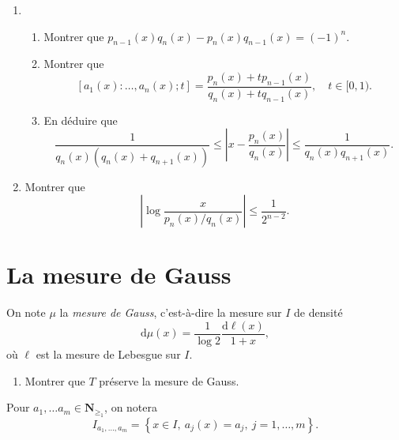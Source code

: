 \documentclass[a4paper,12pt]{article}
\theoremstyle{plain}
\theoremstyle{definition}
\newcommand{\dd}{\mathrm{d}}
\newcommand{\N}{\mathbf{N}}
\begin{document}
\begin{enumerate}[label=\textbf{\arabic*.},resume]
\item 
\begin{enumerate}
\item Montrer que
$
p_{n-1}(x) q_n(x) - p_n(x) q_{n-1}(x) = (-1)^n.
$

\item Montrer que
$$
[a_1(x): \dots, a_n(x); t] = \frac{p_n(x) + tp_{n-1}(x)}{q_n(x) + tq_{n-1}(x)}, \quad t \in [0,1).
$$

\item En d\'eduire que
$$
\frac{1}{q_n(x)(q_n(x) + q_{n+1}(x))} \leq\left|x - \frac{p_n(x)}{q_n(x)}\right| \leq \frac{1}{\displaystyle{q_n(x)q_{n+1}(x)}}.
$$
\end{enumerate}

\item Montrer que 
$$
\left| \log \frac{x}{p_n(x)/q_n(x)}  \right| \leq \frac{1}{2^{n-2}}.
$$

\end{enumerate}

\section*{La mesure de Gauss}
On note $\mu$ la \textit{mesure de Gauss}, c'est-\`a-dire la mesure sur $I$ de densit\'e 
$$
\dd \mu(x) = \frac{1}{\log 2} \frac{\dd \ell (x)}{1+x},
$$
o\`u $\ell$ est la mesure de Lebesgue sur $I$.

\begin{enumerate}[label=\textbf{\arabic*.},resume]

\item Montrer que $T$ pr\'eserve la mesure de Gauss.

\end{enumerate}
\noindent Pour $a_1, \dots a_m \in \N_{\geq_1}$, on notera
$$
I_{a_1, \dots, a_m} = \left\{ x \in I, ~a_j(x) = a_j, ~ j = 1, \dots, m\right\}.
$$
\end{document}

